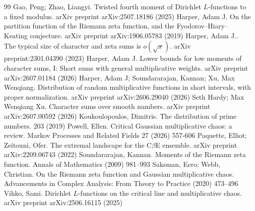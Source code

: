 \documentclass[10pt,a4paper]{amsart}
\numberwithin{equation}{section}
\begin{document}
\begin{thebibliography}{99}
 Gao, Peng; Zhao, Liangyi. Twisted fourth moment of Dirichlet $L$-functions to a fixed modulus. arXiv preprint arXiv:2507.18186 (2025)
 Harper, Adam J. On the partition function of the Riemann zeta function, and the Fyodorov--Hiary--Keating conjecture. arXiv preprint arXiv:1906.05783 (2019)
 Harper, Adam J.. The typical size of character and zeta sums is $o(\sqrt{x})$. arXiv preprint:2301.04390 (2023)
 Harper, Adam J. Lower bounds for low moments of character sums, I: Short sums with general multiplicative weights. arXiv preprint arXiv:2607.01184 (2026)
 Harper, Adam J; Soundararajan, Kannan; Xu, Max Wenqiang. Distribution of random multiplicative functions in short intervals, with proper normalization. arXiv preprint arXiv:2606.29040 (2026)
 Seth Hardy; Max Wenqiang Xu. Character sums over smooth numbers. arXiv preprint arXiv:2607.00592 (2026)
 Koukoulopoulos, Dimitris. The distribution of prime numbers. 203 (2019)
 Powell, Ellen. Critical Gaussian multiplicative chaos: a review. Markov Processes and Related Fields 27 (2026) 557-606
 Paquette, Elliot; Zeitouni, Ofer. The extremal landscape for the C$\beta$E ensemble. arXiv preprint arXiv:2209.06743 (2022)
 Soundararajan, Kannan. Moments of the Riemann zeta function. Annals of Mathematics (2009) 981--993
 Saksman, Eero; Webb, Christian. On the Riemann zeta function and Gaussian multiplicative chaos. Advancements in Complex Analysis: From Theory to Practice (2020) 473--496
 Vihko, Sami. Dirichlet $ L $-functions on the critical line and multiplicative chaos. arXiv preprint arXiv:2506.16115 (2025)
\end{thebibliography}
\end{document}

